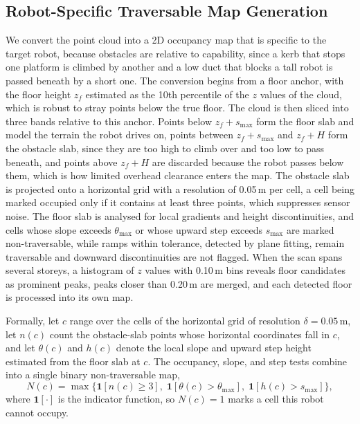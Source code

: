 \documentclass[a4paper, 10pt, conference]{ieeeconf}
\begin{document}
\subsection{Robot-Specific Traversable Map Generation}
\label{sec:travmap}
We convert the point cloud into a 2D occupancy map that is specific to the target robot, because obstacles are relative to capability, since a kerb that stops one platform is climbed by another and a low duct that blocks a tall robot is passed beneath by a short one. The conversion begins from a floor anchor, with the floor height $z_{f}$ estimated as the 10th percentile of the $z$ values of the cloud, which is robust to stray points below the true floor. The cloud is then sliced into three bands relative to this anchor. Points below $z_{f}+s_{\max}$ form the floor slab and model the terrain the robot drives on, points between $z_{f}+s_{\max}$ and $z_{f}+H$ form the obstacle slab, since they are too high to climb over and too low to pass beneath, and points above $z_{f}+H$ are discarded because the robot passes below them, which is how limited overhead clearance enters the map. The obstacle slab is projected onto a horizontal grid with a resolution of 0.05\,m per cell, a cell being marked occupied only if it contains at least three points, which suppresses sensor noise. The floor slab is analysed for local gradients and height discontinuities, and cells whose slope exceeds $\theta_{\max}$ or whose upward step exceeds $s_{\max}$ are marked non-traversable, while ramps within tolerance, detected by plane fitting, remain traversable and downward discontinuities are not flagged. When the scan spans several storeys, a histogram of $z$ values with 0.10\,m bins reveals floor candidates as prominent peaks, peaks closer than 0.20\,m are merged, and each detected floor is processed into its own map.

Formally, let $c$ range over the cells of the horizontal grid of resolution $\delta = 0.05$\,m, let $n(c)$ count the obstacle-slab points whose horizontal coordinates fall in $c$, and let $\theta(c)$ and $h(c)$ denote the local slope and upward step height estimated from the floor slab at $c$. The occupancy, slope, and step tests combine into a single binary non-traversable map,
\begin{equation}
N(c) = \max\bigl\{\mathbf{1}[n(c) \ge 3],\; \mathbf{1}[\theta(c) > \theta_{\max}],\; \mathbf{1}[h(c) > s_{\max}]\bigr\},
\label{eq:ntrav}
\end{equation}
where $\mathbf{1}[\cdot]$ is the indicator function, so $N(c)=1$ marks a cell this robot cannot occupy.
\end{document}

